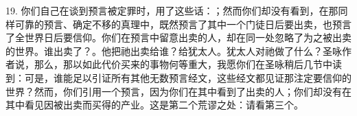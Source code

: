 19. 你们自己在谈到预言被定罪时，用了这些话：；然而你们却没有看到，在那同样可靠的预言、确定不移的真理中，既然预言了其中一个门徒日后要出卖，也预言了全世界日后要信仰。你们在预言中留意出卖的人，却在同一处忽略了为之被出卖的世界。谁出卖了？。他把祂出卖给谁？给犹太人。犹太人对祂做了什么？圣咏作者说，那么，那以如此代价买来的事物何等重大，我愿你们在圣咏稍后几节中读到：可是，谁能足以引证所有其他无数预言经文，这些经文都见证那注定要信仰的世界？然而，你们引用一个预言，因为你们在其中看到了出卖的人；你们却没有在其中看见因被出卖而买得的产业。这是第二个荒谬之处：请看第三个。\par

